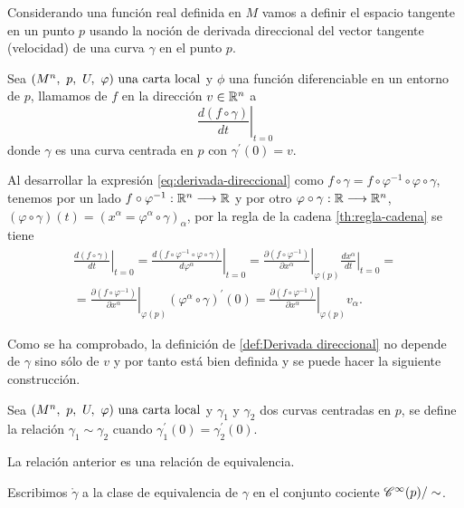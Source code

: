 Considerando una función real definida en $M$ vamos a definir el espacio tangente en un
punto $p$ usando la noción de derivada direccional del vector tangente (velocidad) de una curva
$\gamma$ en el punto $p$.

\begin{definition}
  Sea $(M^n,\ p,\ U,\ \varphi)\textmd{ una carta local}$ y $\phi$ una función diferenciable en un entorno de $p$, llamamos
   de $f$ en la dirección $v\in\mathbb{R}^n$ a
  \begin{equation}
    \label{eq:derivada-direccional}
    \left.\frac{d(f\circ\gamma)}{dt}\right|_{t=0}
  \end{equation}
  donde $\gamma$ es una curva centrada en $p$ con $\gamma^{'}(0)=v$.
\end{definition}

Al desarrollar la expresión \ref{eq:derivada-direccional} como
$f\circ\gamma=f\circ\varphi^{-1}\circ\varphi\circ\gamma$, tenemos por un lado
$f\circ\varphi^{-1}:\mathbb{R}^n\longrightarrow \mathbb{R}$
y por otro
$\varphi\circ\gamma:\mathbb{R}\longrightarrow \mathbb{R}^n$, $(\varphi\circ\gamma)(t)=
(x^\alpha=\varphi^\alpha\circ\gamma)_{\alpha}$,
por la regla de la cadena \ref{th:regla-cadena} se tiene
\begin{multline*}
  \left.\frac{d(f\circ\gamma)}{dt}\right|_{t=0}=
  \left.\frac{d(f\circ\varphi^{-1}\circ\varphi\circ\gamma)}{d\varphi^\alpha}\right|_{t=0}=
  \left.\frac{\partial(f\circ\varphi^{-1})}{\partial x^\alpha}\right|_{\varphi(p)}
  \left.\frac{dx^\alpha}{dt}\right|_{t=0}=\\
  =\left.\frac{\partial(f\circ\varphi^{-1})}{\partial x^\alpha}\right|_{\varphi(p)}
  (\varphi^\alpha\circ\gamma)^{'}(0)=
  \left.\frac{\partial(f\circ\varphi^{-1})}{\partial x^\alpha}\right|_{\varphi(p)}v_\alpha.
\end{multline*}

Como se ha comprobado, la definición de \ref{def:Derivada direccional} no depende de $\gamma$
sino sólo de $v$ y por tanto está bien definida y se puede hacer la siguiente construcción.

Sea $(M^n,\ p,\ U,\ \varphi)\textmd{ una carta local}$ y $\gamma_1$ y $\gamma_2$ dos curvas centradas en $p$, se define la relación
$\gamma_1\sim\gamma_2$ cuando $\gamma_1^{'}(0)=\gamma_2^{'}(0)$.

\begin{exercise}
  \label{ex:relacion-equivalencia}
  La relación anterior es una relación de equivalencia.
\end{exercise}

Escribimos $\mathring{\gamma}$ a la clase de equivalencia de $\gamma$ en el conjunto cociente
$\mathscr{C}^\infty(p)/\sim$.

